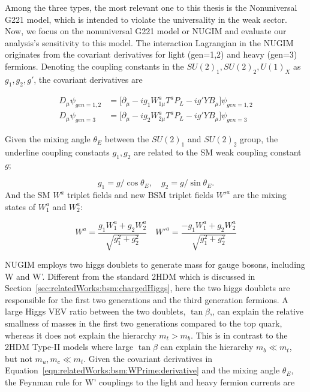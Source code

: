 Among the three types, the most relevant one to this thesis is the Nonuniversal G221 model, which is intended to violate the universality in the weak sector. Now, we focus on the nonuniversal G221 model or NUGIM and evaluate our analysis's sensitivity to this model. The interaction Lagrangian in the NUGIM originates from the covariant derivatives for light (gen=1,2) and heavy (gen=3) fermions. Denoting the coupling constants in the $SU(2)_1 , SU(2)_2, U(1)_X$ as $g_1, g_2, g'$, the covariant derivatives are

\begin{equation}
\begin{split}
	D_\mu \psi_{gen=1,2} &= \big[ \partial_\mu -ig_1W^a_{1\mu} T^a P_L - ig'YB_\mu\big] \psi_{gen=1,2}  \\
    D_\mu \psi_{gen=3} &= \big[ \partial_\mu -ig_2W^a_{2\mu} T^a P_L - ig'YB_\mu\big] \psi_{gen=3} 
\end{split}
\label{eqn:relatedWorks:bsm:WPrime:derivative}
\end{equation}

\noindent Given the mixing angle $\theta_E$ between the $SU(2)_1$ and $SU(2)_2$ group, the underline coupling constants $g_1, g_2$ are related to the SM weak coupling constant $g$;

\begin{equation}
	g_1=g/ \cos \theta_E, \quad g_2=g/ \sin \theta_E.
\end{equation}
\noindent And the SM $W^a$ triplet fields and new BSM triplet fields $W'^a$  are the mixing states of $W_1^a$ and $W_2^a$:

\begin{equation}
	W^a = \frac{g_1 W^a_1 + g_2 W_2^a}{\sqrt{g_1^2+g_2^2}} \quad W'^a = \frac{-g_1 W^a_1 + g_2 W_2^a}{\sqrt{g_1^2+g_2^2}}
\end{equation}

\noindent NUGIM employs two higgs doublets to generate mass for gauge bosons, including W and W'. Different from the standard 2HDM which is discussed in Section~\ref{sec:relatedWorks:bsm:chargedHiggs}, here the two higgs doublets are responsible for the first two generations and the third generation fermions. A large Higgs VEV ratio between the two doublets, $\tan \beta$,, can explain the relative smallness of masses in the first two generations compared to the top quark, whereas it does not explain the hierarchy $m_t > m_b$. This is in contrast to the 2HDM Type-II models where large $\tan \beta$ can explain the hierarchy $m_b\ll m_t$, but not $m_u, m_c  \ll m_t$. Given the covariant derivatives in Equation~\ref{eqn:relatedWorks:bsm:WPrime:derivative} and the mixing angle $\theta_E$, the Feynman rule for W'  \cite{Edelhauser:2014yra} couplings to the light and heavy fermion currents are 

